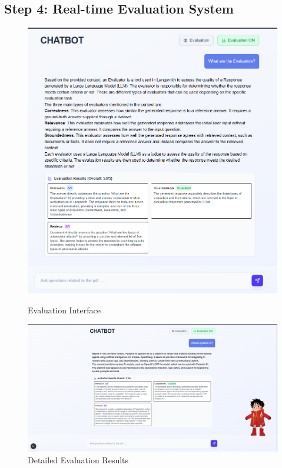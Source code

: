 \documentclass[12pt,a4paper]{article}
\begin{document}
\subsection{Step 4: Real-time Evaluation System}

\begin{figure}[h]
    \centering
    \begin{minipage}{0.45\textwidth}
        \centering
        \includegraphics[width=\textwidth]{screenshots/eval.png}
        \caption{Evaluation Interface}
    \end{minipage}
    \hfill
    \begin{minipage}{0.45\textwidth}
        \centering
        \includegraphics[width=\textwidth]{screenshots/evaluation.png}
        \caption{Detailed Evaluation Results}
    \end{minipage}
\end{figure}
\end{document}
